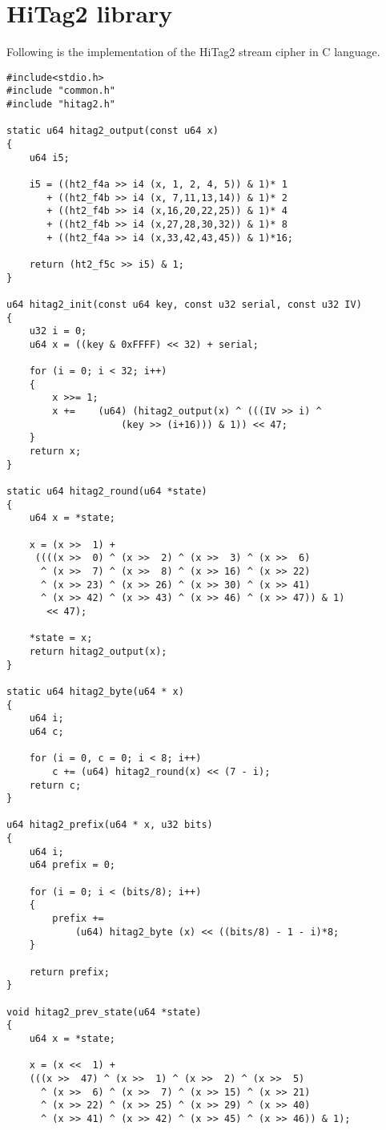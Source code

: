 \chapter{HiTag2 library}
\label{app:hitag2-library}
Following is the implementation of the HiTag2 stream cipher in C language.
 
\begin{lstlisting}[frame=tb]
#include<stdio.h>
#include "common.h"
#include "hitag2.h"

static u64 hitag2_output(const u64 x)
{
	u64 i5;

	i5 = ((ht2_f4a >> i4 (x, 1, 2, 4, 5)) & 1)* 1
	   + ((ht2_f4b >> i4 (x, 7,11,13,14)) & 1)* 2
	   + ((ht2_f4b >> i4 (x,16,20,22,25)) & 1)* 4
	   + ((ht2_f4b >> i4 (x,27,28,30,32)) & 1)* 8
	   + ((ht2_f4a >> i4 (x,33,42,43,45)) & 1)*16;

	return (ht2_f5c >> i5) & 1;
}

u64 hitag2_init(const u64 key, const u32 serial, const u32 IV)
{
	u32 i = 0;
	u64 x = ((key & 0xFFFF) << 32) + serial;

	for (i = 0; i < 32; i++)
	{
		x >>= 1;
		x +=	(u64) (hitag2_output(x) ^ (((IV >> i) ^ 
					(key >> (i+16))) & 1)) << 47;
	}
	return x;
}

static u64 hitag2_round(u64 *state)
{
	u64 x = *state;

	x = (x >>  1) +
	 ((((x >>  0) ^ (x >>  2) ^ (x >>  3) ^ (x >>  6)
	  ^ (x >>  7) ^ (x >>  8) ^ (x >> 16) ^ (x >> 22)
	  ^ (x >> 23) ^ (x >> 26) ^ (x >> 30) ^ (x >> 41)
	  ^ (x >> 42) ^ (x >> 43) ^ (x >> 46) ^ (x >> 47)) & 1)
	   << 47);

	*state = x;
	return hitag2_output(x);
}

static u64 hitag2_byte(u64 * x)
{
	u64 i;
	u64 c;

	for (i = 0, c = 0; i < 8; i++) 
		c += (u64) hitag2_round(x) << (7 - i);
	return c;
}

u64 hitag2_prefix(u64 * x, u32 bits)
{
	u64 i;
	u64 prefix = 0;

	for (i = 0; i < (bits/8); i++)
	{
		prefix += 
			(u64) hitag2_byte (x) << ((bits/8) - 1 - i)*8;
	}

	return prefix;
}

void hitag2_prev_state(u64 *state)
{
	u64 x = *state;

	x = (x <<  1) +
	(((x >>  47) ^ (x >>  1) ^ (x >>  2) ^ (x >>  5)
	  ^ (x >>  6) ^ (x >>  7) ^ (x >> 15) ^ (x >> 21)
	  ^ (x >> 22) ^ (x >> 25) ^ (x >> 29) ^ (x >> 40)
	  ^ (x >> 41) ^ (x >> 42) ^ (x >> 45) ^ (x >> 46)) & 1);


\end{lstlisting}
